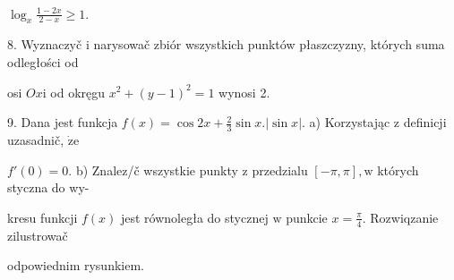 \documentclass[a4paper,12pt]{article}
\begin{document}
$\displaystyle \log_{x}\frac{1-2x}{2-x}\geq 1.$

8. Wyznaczyč $\mathrm{i}$ narysowač zbiór wszystkich punktów płaszczyzny, których suma odległości od

osi $Ox\mathrm{i}$ od okręgu $x^{2}+(y-1)^{2}=1$ wynosi 2.

9. Dana jest funkcja $f(x) =\displaystyle \cos 2x+\frac{2}{3}\sin x. |\sin x|$. a) Korzystając $\mathrm{z}$ definicji uzasadnič, $\dot{\mathrm{z}}\mathrm{e}$

$f'(0) = 0$. b) Znalez/č wszystkie punkty $\mathrm{z}$ przedzialu $[-\pi,\pi], \mathrm{w}$ których styczna do wy-

kresu funkcji $f(x)$ jest równoległa do stycznej $\mathrm{w}$ punkcie $x = \displaystyle \frac{\pi}{4}$. Rozwiqzanie zilustrowač

odpowiednim rysunkiem.
\end{document}
